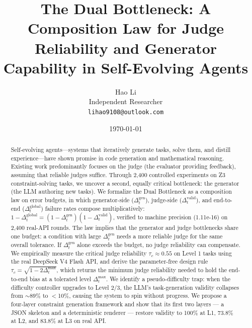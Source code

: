 \documentclass{article}
\title{The Dual Bottleneck: A Composition Law for Judge Reliability and
Generator Capability in Self-Evolving Agents}
\author{Hao Li\\[2pt]\small Independent Researcher\\[2pt]\small \texttt{lihao9108@outlook.com}}
\date{\today}
\begin{document}
\maketitle

\begin{abstract}
Self-evolving agents---systems that iteratively generate tasks, solve them, and distill
experience---have shown promise in code generation and mathematical reasoning. Existing work
predominantly focuses on the judge (the evaluator providing feedback), assuming that reliable
judges suffice. Through 2,400 controlled experiments on Z3 constraint-solving tasks, we uncover a
second, equally critical bottleneck: the generator (the LLM authoring new tasks). We formalize the
Dual Bottleneck as a composition law on error budgets, in which generator-side
($\Delta_t^{\mathrm{gen}}$), judge-side ($\Delta_t^{\mathrm{valid}}$), and end-to-end
($\Delta_t^{\mathrm{global}}$) failure rates compose multiplicatively:
$1 - \Delta_t^{\mathrm{global}} = (1 - \Delta_t^{\mathrm{gen}})(1 - \Delta_t^{\mathrm{valid}})$, verified
to machine precision (1.11e-16) on 2,400 real-API rounds. The law implies that the generator and
judge bottlenecks share one budget: a condition with large $\Delta_t^{\mathrm{gen}}$ needs a more
reliable judge for the same overall tolerance. If $\Delta_t^{\mathrm{gen}}$ alone exceeds the
budget, no judge reliability can compensate. We empirically measure the critical judge reliability
$\tau_c \approx 0.55$ on Level 1 tasks using the real DeepSeek V4 Flash API, and derive the
parameter-free design rule $\tau_c = \sqrt{1-2\Delta_t^{\max}}$, which returns the minimum judge
reliability needed to hold the end-to-end bias at a tolerated level $\Delta_t^{\max}$. We identify a
pseudo-difficulty trap: when the difficulty
controller upgrades to Level 2/3, the LLM's task-generation validity collapses from $\sim$89\% to
$<$10\%, causing the system to spin without progress. We propose a four-layer constraint generation
framework and show that its first two layers --- a JSON skeleton and a deterministic renderer ---
restore validity to 100\% at L1, 73.8\% at L2, and 83.8\% at L3 on real API.
\end{abstract}

\end{document}

